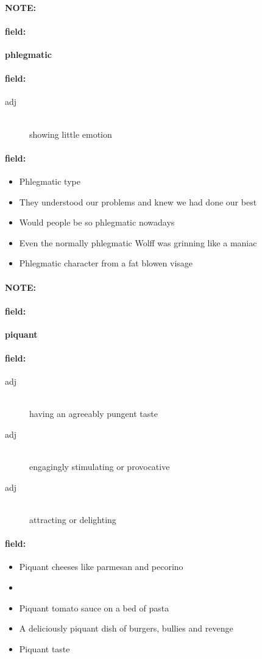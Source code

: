 \documentclass[12pt]{article}
\newenvironment{note}{\paragraph{NOTE:}}{}
\newenvironment{field}{\paragraph{field:}}{}
\begin{document}
\begin{note}
\begin{field}
\textbf{\large phlegmatic}
\end{field}


\begin{field}
\begin{description}
\item[adj] \hfill \\ 
showing little emotion

\end{description}
\end{field}

\begin{field}
\begin{itemize}
\item Phlegmatic type
\item They understood our problems and knew we had done our best
\item  Would people be so phlegmatic nowadays
\item Even the normally phlegmatic Wolff was grinning like a maniac
\item Phlegmatic character from a fat blowen visage
\end{itemize}
\end{field}
\end{note}
\begin{note}
\begin{field}
\textbf{\large piquant}
\end{field}


\begin{field}
\begin{description}
\item[adj] \hfill \\ 
having an agreeably pungent taste

\item[adj] \hfill \\ 
engagingly stimulating or provocative

\item[adj] \hfill \\ 
attracting or delighting

\end{description}
\end{field}

\begin{field}
\begin{itemize}
\item Piquant cheeses like parmesan and pecorino
\item 
\item Piquant tomato sauce on a bed of pasta
\item A deliciously piquant dish of burgers, bullies and revenge
\item Piquant taste
\end{itemize}
\end{field}
\end{note}
\end{document}
